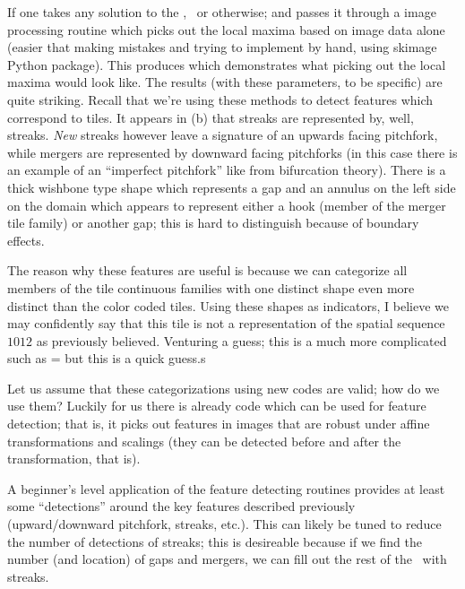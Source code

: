 \begin{description}
{If one takes any solution to the \KSe, \twot\ or otherwise; and passes it through a image
processing routine which picks out the local maxima based on image data alone (easier
that making mistakes and trying to implement by hand, using skimage Python package).
This produces  which demonstrates what picking out the local maxima
would look like. The results (with these parameters, to be specific) are quite striking.
Recall that we're using these methods to detect features which correspond to tiles.
It appears in (b) that streaks are represented by, well, streaks. \textit{New} streaks however
leave a signature of
an upwards facing pitchfork, while mergers are represented by downward facing pitchforks (in this case there
is an example of an ``imperfect pitchfork'' like from bifurcation theory). There is a thick wishbone type shape
which represents a gap and an annulus on the left side on the domain which appears to represent either a hook (member of the
merger tile family) or another gap; this is hard to distinguish because of boundary effects.

The reason why these features are useful is because we can categorize all members of the tile continuous
families with one distinct shape even more distinct than the color coded tiles.
Using these shapes as indicators, I believe we may confidently say that this tile is not a
representation of the spatial sequence $1012$ as previously believed. Venturing a guess; this is
a much more complicated such as
\beq
\Mm=\left[\begin{array}{c}
0\,0\,0\,0\,0\,0\,0 \\
2\,2\,2\,2\,0\,0\,0 \\
0\,1\,0\,1\,0\,0\,0
0\,0\,0\,0\,0\,0\,0
\end{array}\right]
but this is a quick guess.s

Let us assume that these categorizations using new codes are valid; how do we use them?
Luckily for us there is already code which can be used for feature detection; that is,
it picks out features in images that are robust under affine transformations and scalings
(they can be detected before and after the transformation, that is).

A beginner's level application of the feature detecting routines provides at least some
``detections'' around the key features described previously (upward/downward pitchfork, streaks, etc.).
This can likely be tuned to reduce the number of detections of streaks; this is desireable
because if we find the number (and location) of gaps and mergers, we can fill out the rest
of the \twot\ with streaks.

}
\end{description}

